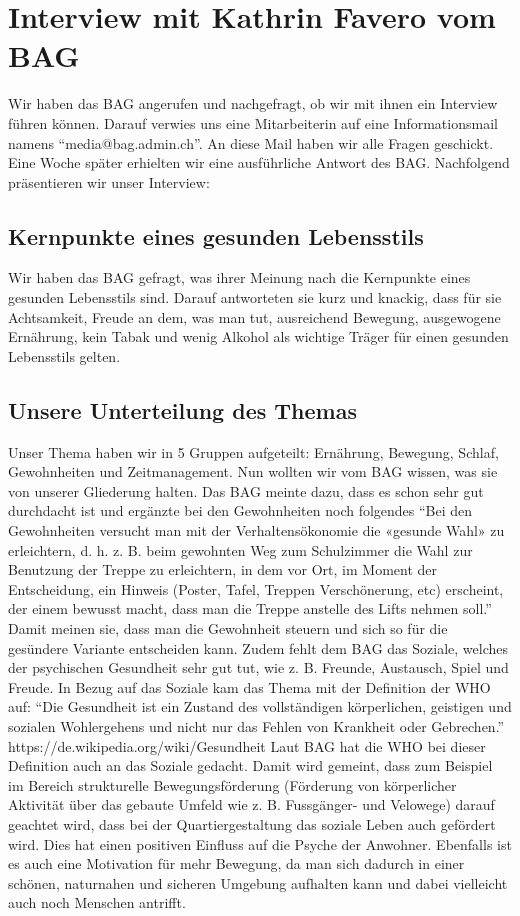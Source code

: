 \chapter{Interview mit Kathrin Favero vom BAG}
\authortoc{\bastian}{\chapterident}
Wir haben das BAG angerufen und nachgefragt, ob wir mit ihnen ein Interview führen können. Darauf verwies uns eine Mitarbeiterin auf eine Informationsmail namens “media@bag.admin.ch”. An diese Mail haben wir alle Fragen geschickt. Eine Woche später erhielten wir eine ausführliche Antwort des BAG. Nachfolgend präsentieren wir unser Interview:
\section{Kernpunkte eines gesunden Lebensstils}
Wir haben das BAG gefragt, was ihrer Meinung nach die Kernpunkte eines gesunden Lebensstils sind. Darauf antworteten sie kurz und knackig, dass für sie Achtsamkeit, Freude an dem, was man tut, ausreichend Bewegung, ausgewogene
Ernährung, kein Tabak und wenig Alkohol als wichtige Träger für einen gesunden Lebensstils gelten.
\section{Unsere Unterteilung des Themas}
Unser Thema haben wir in 5 Gruppen aufgeteilt: Ernährung, Bewegung, Schlaf, Gewohnheiten und Zeitmanagement. Nun wollten wir vom BAG wissen, was sie von unserer Gliederung halten. Das BAG meinte dazu, dass es schon sehr gut durchdacht ist und ergänzte bei den Gewohnheiten noch folgendes “Bei den Gewohnheiten versucht man mit der Verhaltensökonomie die «gesunde Wahl» zu erleichtern, d. h. z. B. beim gewohnten Weg zum Schulzimmer die Wahl zur Benutzung der Treppe zu erleichtern, in dem vor Ort, im Moment der Entscheidung, ein Hinweis (Poster, Tafel, Treppen Verschönerung, etc) erscheint, der einem bewusst macht, dass man die Treppe anstelle des Lifts nehmen soll.” Damit meinen sie, dass man die Gewohnheit steuern und sich so für die gesündere Variante entscheiden kann. Zudem fehlt dem BAG das Soziale, welches der psychischen Gesundheit sehr gut tut, wie z. B. Freunde, Austausch, Spiel und Freude.
In Bezug auf das Soziale kam das Thema mit der Definition der WHO auf: “Die Gesundheit ist ein Zustand des vollständigen körperlichen, geistigen und sozialen Wohlergehens und nicht nur das Fehlen von Krankheit oder Gebrechen.” \cite{gesundheit_definition}
https://de.wikipedia.org/wiki/Gesundheit
Laut BAG hat die WHO bei dieser Definition auch an das Soziale gedacht. Damit wird gemeint, dass zum Beispiel im Bereich strukturelle Bewegungsförderung (Förderung von körperlicher Aktivität über das gebaute Umfeld wie z. B. Fussgänger- und Velowege) darauf geachtet wird, dass bei der Quartiergestaltung das soziale Leben auch gefördert wird. Dies hat einen positiven Einfluss auf die Psyche der Anwohner. Ebenfalls ist es auch eine Motivation für mehr Bewegung, da man sich dadurch in einer schönen, naturnahen und sicheren Umgebung aufhalten kann und dabei vielleicht auch noch Menschen antrifft.

